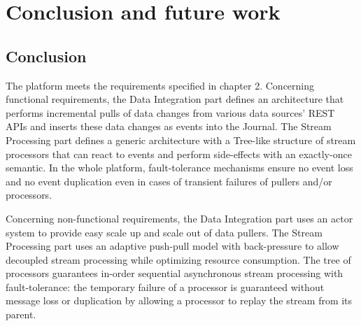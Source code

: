 \chapter{Conclusion and future work}

\section{Conclusion}

The platform meets the requirements specified in chapter 2. 
Concerning functional requirements, the Data Integration part defines an architecture that performs incremental pulls of data changes from various data sources' REST APIs and inserts these data changes as events into the Journal. The Stream Processing part defines a generic architecture with a Tree-like structure of stream processors that can react to events and perform side-effects with an exactly-once semantic. In the whole platform, fault-tolerance mechanisms ensure no event loss and no event duplication even in cases of transient failures of pullers and/or processors.

Concerning non-functional requirements, the Data Integration part uses an actor system to provide easy scale up and scale out of data pullers. The Stream Processing part uses an adaptive push-pull model with back-pressure to allow decoupled stream processing while optimizing resource consumption. The tree of processors guarantees in-order sequential asynchronous stream processing with fault-tolerance: the temporary failure of a processor is guaranteed without message loss or duplication by allowing a processor to replay the stream from its parent.
\\

